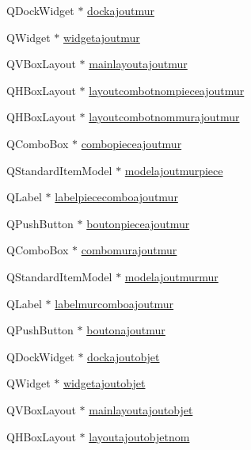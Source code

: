 \begin{DoxyCompactItemize}
Q\+Dock\+Widget $\ast$ \hyperlink{class_main_window_a0eb8a5430ee63be81d1c931749ccb5f0}{dockajoutmur}
\item 
Q\+Widget $\ast$ \hyperlink{class_main_window_a0513cad983e4a377963a107bb75eea00}{widgetajoutmur}
\item 
Q\+V\+Box\+Layout $\ast$ \hyperlink{class_main_window_a0d98038a979af819255fc6441f2ae274}{mainlayoutajoutmur}
\item 
Q\+H\+Box\+Layout $\ast$ \hyperlink{class_main_window_abc11df038fdb20698d794bd9fb7e3538}{layoutcombotnompieceajoutmur}
\item 
Q\+H\+Box\+Layout $\ast$ \hyperlink{class_main_window_acde30e931bf228d3d0225bf1645dcb55}{layoutcombotnommurajoutmur}
\item 
Q\+Combo\+Box $\ast$ \hyperlink{class_main_window_ab71c3bab35fb829f1716bf42fc96689a}{combopieceajoutmur}
\item 
Q\+Standard\+Item\+Model $\ast$ \hyperlink{class_main_window_a9e0fb8f99860fbcbdb1058e3118ed73a}{modelajoutmurpiece}
\item 
Q\+Label $\ast$ \hyperlink{class_main_window_a3273a454e9e9113b50a6d84a14374554}{labelpiececomboajoutmur}
\item 
Q\+Push\+Button $\ast$ \hyperlink{class_main_window_ade94e2a736d49afd5634894946500126}{boutonpieceajoutmur}
\item 
Q\+Combo\+Box $\ast$ \hyperlink{class_main_window_ac78b4cd273ba66ef034f739a34945574}{combomurajoutmur}
\item 
Q\+Standard\+Item\+Model $\ast$ \hyperlink{class_main_window_acd367909c8521374eb653c45461cc156}{modelajoutmurmur}
\item 
Q\+Label $\ast$ \hyperlink{class_main_window_a83cb6b78d1b16b6cd67fad3eb969ecc6}{labelmurcomboajoutmur}
\item 
Q\+Push\+Button $\ast$ \hyperlink{class_main_window_aabddd42321113fc4061c2d9364cef340}{boutonajoutmur}
\item 
Q\+Dock\+Widget $\ast$ \hyperlink{class_main_window_ad94b219ae474fd89c2d7a7c237cb13c5}{dockajoutobjet}
\item 
Q\+Widget $\ast$ \hyperlink{class_main_window_a0d183b04e212e26798d316d9f6125f97}{widgetajoutobjet}
\item 
Q\+V\+Box\+Layout $\ast$ \hyperlink{class_main_window_a522646401a64c4ee90625f634f33305f}{mainlayoutajoutobjet}
\item 
Q\+H\+Box\+Layout $\ast$ \hyperlink{class_main_window_aeec92ce29084eabb034bade137ad4377}{layoutajoutobjetnom}
\item 

\end{DoxyCompactItemize}
